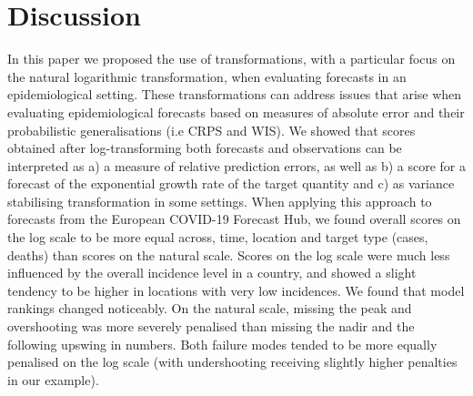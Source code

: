 \documentclass{article}
\begin{document}
\section{Discussion}
\label{sec:discussion}

In this paper we proposed the use of transformations, with a particular focus on the natural logarithmic transformation, when evaluating forecasts in an epidemiological setting. These transformations can address issues that arise when evaluating epidemiological forecasts based on measures of absolute error and their probabilistic generalisations (i.e CRPS and WIS). We showed that scores obtained after log-transforming both forecasts and observations can be interpreted as a) a measure of relative prediction errors, as well as b) a score for a forecast of the exponential growth rate of the target quantity and c) as variance stabilising transformation in some settings.
When applying this approach to forecasts from the European COVID-19 Forecast Hub, we found overall scores on the log scale to be more equal across, time, location and target type (cases, deaths) than scores on the natural scale. Scores on the log scale were much less influenced by the overall incidence level in a country, and showed a slight tendency to be higher in locations with very low incidences. We found that model rankings changed noticeably. 
On the natural scale, missing the peak and overshooting was more severely penalised than missing the nadir and the following upswing in numbers. Both failure modes tended to be more equally penalised on the log scale (with undershooting receiving slightly higher penalties in our example). 
\end{document}
